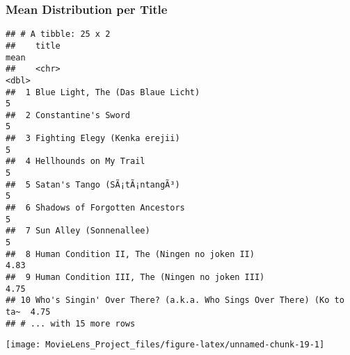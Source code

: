 \documentclass[]{article}
\begin{document}
\hypertarget{mean-distribution-per-title}{%
\subsubsection{Mean Distribution per
Title}\label{mean-distribution-per-title}}

\begin{verbatim}
## # A tibble: 25 x 2
##    title                                                               mean
##    <chr>                                                              <dbl>
##  1 Blue Light, The (Das Blaue Licht)                                   5   
##  2 Constantine's Sword                                                 5   
##  3 Fighting Elegy (Kenka erejii)                                       5   
##  4 Hellhounds on My Trail                                              5   
##  5 Satan's Tango (SÃ¡tÃ¡ntangÃ³)                                       5   
##  6 Shadows of Forgotten Ancestors                                      5   
##  7 Sun Alley (Sonnenallee)                                             5   
##  8 Human Condition II, The (Ningen no joken II)                        4.83
##  9 Human Condition III, The (Ningen no joken III)                      4.75
## 10 Who's Singin' Over There? (a.k.a. Who Sings Over There) (Ko to ta~  4.75
## # ... with 15 more rows
\end{verbatim}

\begin{center}\texttt{[image: MovieLens\_Project\_files/figure-latex/unnamed-chunk-19-1]} \end{center}
\end{document}
